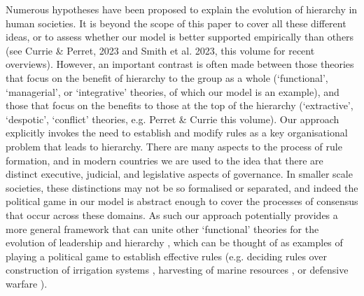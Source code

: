 \documentclass{rstb}
\begin{document}
\begin{linenumbers}
Numerous hypotheses have been proposed to explain the evolution of hierarchy in human societies. It is beyond the scope of this paper to cover all these different ideas, or to assess whether our model is better supported empirically than others (see Currie \& Perret, 2023 and Smith et al. 2023, this volume for recent overviews). However, an important contrast is often made between those theories that focus on the benefit of hierarchy to the group as a whole (`functional', `managerial', or `integrative' theories, of which our model is an example), and those that focus on the benefits to those at the top of the hierarchy (`extractive', `despotic', `conflict' theories, e.g. Perret \& Currie this volume). Our approach explicitly invokes the need to establish and modify rules as a key organisational problem that leads to hierarchy. There are many aspects to the process of rule formation, and in modern countries we are used to the idea that there are distinct executive, judicial, and legislative aspects of governance. In smaller scale societies, these distinctions may not be so formalised or separated, and indeed the political game in our model is abstract enough to cover the processes of consensus that occur across these domains. As such our approach potentially provides a more general framework that can unite other `functional' theories for the evolution of leadership and hierarchy \cite{Calvert:1992:a,vanVugt:2006:a,King:2009:a,Hooper:2010:a,Sterelny:2013:a} , which can be thought of as examples of playing a political game to establish effective rules (e.g. deciding rules over construction of irrigation systems \cite{Wittfogel:1957:a,Nichols:1993:a,Spencer:1993:a,Carballo:2014:a}, harvesting of marine resources \cite{Arnold:1995:a,Friesen:1999:a,Alvard:2002:a}, or defensive warfare \cite{Boone:1992:a,Roscoe:2013:a}).


\end{linenumbers}
\end{document}
